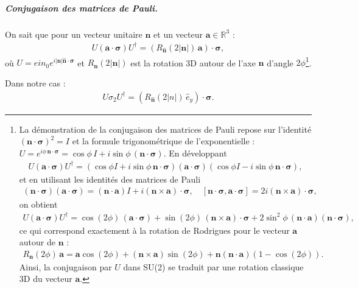 \subparagraph{Conjugaison des matrices de Pauli.}
On sait que pour un vecteur unitaire $\bm{n}$ et un vecteur $\bm{a} \in \mathbb{R}^3$ :
\begin{eqnarray}
U (\bm{a} \cdot \bm{\sigma}) U^\dagger = (R_{\hat{\bm{n}}}(2|\bm{n}|) \, \bm{a}) \cdot \bm{\sigma},
\end{eqnarray}
où $U = e{i n_0}e^{i |\bm{n}| \hat{\bm{n}} \cdot \bm{\sigma}}$ et $R_{\bm{n}}(2|\bm{n}|)$ est la rotation 3D autour de l'axe $\bm{n}$ d'angle $2\phi$\footnote{La démonstration de la conjugaison des matrices de Pauli repose sur l'identité $(\bm{n}\cdot\bm{\sigma})^2 = I$ et la formule trigonométrique de l'exponentielle : $U = e^{i \phi \, \bm{n} \cdot \bm{\sigma}} = \cos \phi \, I + i \sin \phi \, (\bm{n} \cdot \bm{\sigma})$. En développant
\begin{eqnarray}
U (\bm{a} \cdot \bm{\sigma}) U^\dagger = (\cos \phi I + i \sin \phi \, \bm{n} \cdot \bm{\sigma}) (\bm{a} \cdot \bm{\sigma}) (\cos \phi I - i \sin \phi \, \bm{n} \cdot \bm{\sigma}),
\end{eqnarray}
et en utilisant les identités des matrices de Pauli
\begin{eqnarray}
(\bm{n}\cdot\bm{\sigma})(\bm{a}\cdot\bm{\sigma}) = (\bm{n}\cdot\bm{a}) I + i (\bm{n} \times \bm{a}) \cdot \bm{\sigma},
\quad
[\bm{n}\cdot\bm{\sigma}, \bm{a}\cdot\bm{\sigma}] = 2 i (\bm{n} \times \bm{a}) \cdot \bm{\sigma},
\end{eqnarray}
on obtient
\begin{eqnarray}
U (\bm{a} \cdot \bm{\sigma}) U^\dagger = \cos(2\phi) \, (\bm{a}\cdot\bm{\sigma}) + \sin(2\phi) \, (\bm{n} \times \bm{a}) \cdot \bm{\sigma} + 2 \sin^2 \phi \, (\bm{n} \cdot \bm{a}) (\bm{n} \cdot \bm{\sigma}),
\end{eqnarray}
ce qui correspond exactement à la rotation de Rodrigues pour le vecteur $\bm{a}$ autour de $\bm{n}$ :
\begin{eqnarray}
R_{\bm{n}}(2\phi) \, \bm{a} = \bm{a} \cos(2\phi) + (\bm{n} \times \bm{a}) \sin(2\phi) + \bm{n} (\bm{n} \cdot \bm{a}) (1 - \cos(2\phi)).
\end{eqnarray}
Ainsi, la conjugaison par $U$ dans SU(2) se traduit par une rotation classique 3D du vecteur $\bm{a}$.}.  

Dans notre cas :
\begin{eqnarray}
U \sigma_2 U^\dagger = (R_{\hat{\bm{n}}}(2\vert n \vert ) \, \hat{e}_y) \cdot \bm{\sigma}.
\end{eqnarray}




